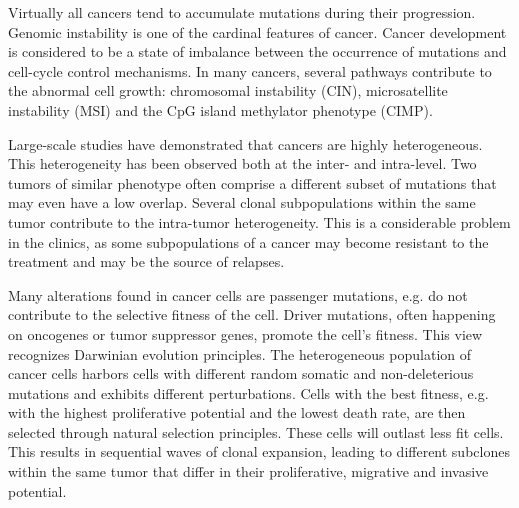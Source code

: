     Virtually all cancers tend to accumulate mutations during their progression.
    Genomic instability is one of the cardinal features of cancer.
    Cancer development is considered to be a state of imbalance between the
    occurrence of mutations and cell-cycle control mechanisms. In many cancers,
    several pathways contribute to the abnormal cell growth: chromosomal
    instability (CIN), microsatellite instability (MSI) and the CpG island
    methylator phenotype (CIMP).

    Large-scale studies have demonstrated that cancers are highly heterogeneous.
    This heterogeneity has been observed both at the inter- and intra-level. Two
    tumors of similar phenotype often comprise a different subset of mutations
    that may even have a low overlap. Several clonal subpopulations within the
    same tumor contribute to the intra-tumor heterogeneity. This is a
    considerable problem in the clinics, as some subpopulations of a cancer may
    become resistant to the  treatment and may be the source of relapses.

    Many alterations found in cancer cells are passenger mutations, e.g. do not
    contribute to the selective fitness of the cell. Driver mutations, often
    happening on oncogenes or tumor suppressor genes, promote the cell's
    fitness. This view recognizes Darwinian evolution principles. The
    heterogeneous  population of cancer cells harbors cells with different
    random somatic and non-deleterious mutations and exhibits different
    perturbations. Cells with the best fitness, e.g. with the highest
    proliferative potential  and the lowest death rate, are then selected
    through natural selection principles. These cells will outlast less fit
    cells. This results in  sequential waves of clonal expansion, leading to
    different subclones within the same tumor that differ in their
    proliferative, migrative and invasive potential.

